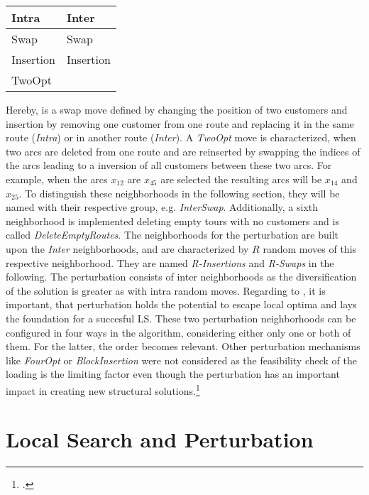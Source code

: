 \begin{table}[ht]
    \centering
    \begin{tabular}{@{}P{0.3\textwidth}P{0.3\textwidth}@{}}
        \toprule
        \textbf{Intra} & \textbf{Inter} \\
        \midrule
        Swap           & Swap           \\
        Insertion      & Insertion      \\
        TwoOpt         &                \\
        \bottomrule
    \end{tabular}
\end{table}
Hereby, is a swap move defined by changing the position of two customers and insertion by removing one customer from one route
and replacing it in the same route (\textit{Intra}) or in another route (\textit{Inter}). A \textit{TwoOpt} move is characterized, when two arcs are deleted
from one route and are reinserted by swapping the indices of the arcs leading to a inversion of all customers between these two arcs.
For example, when the arcs $x_{12}$ are $x_{45}$ are selected the resulting arcs will be $x_{14}$ and $x_{25}$. To distinguish these
neighborhoods in the following section, they will be named with their respective group, e.g. \textit{InterSwap}. Additionally, a sixth
neighborhood is implemented deleting empty tours with no customers and is called \textit{DeleteEmptyRoutes}.
The neighborhoods for the perturbation are built upon the \textit{Inter} neighborhoods, and are characterized by $R$ random moves of
this respective neighborhood. They are named \textit{R-Insertions} and \textit{R-Swaps} in the
following. The perturbation consists of inter neighborhoods as the diversification of the solution is
greater as with intra random moves. Regarding to \cite{lourenco_iterated_2003}, it is important, that perturbation holds the potential
to escape local optima and lays the foundation for a succesful \gls{LS}. These two perturbation neighborhoods
can be configured in four ways in the algorithm, considering either only one or both of them. For the latter, the order becomes relevant.
Other perturbation mechanisms like \textit{FourOpt} or \textit{BlockInsertion} were not considered as the feasibility check of the loading is the limiting factor even though
the perturbation has an important impact in creating new structural solutions.\footcite[cf.][pp. 329--332]{lourenco_iterated_2003}

\section{Local Search and Perturbation}
\label{sec:LSandPerturbation}

